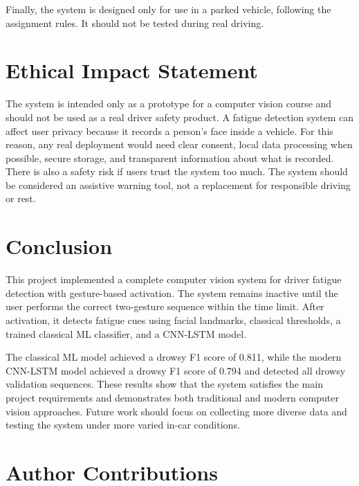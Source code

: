 \documentclass[conference]{IEEEtran}
\begin{document}
Finally, the system is designed only for use in a parked vehicle, following the assignment rules. It should not be tested during real driving.

\section*{Ethical Impact Statement}

The system is intended only as a prototype for a computer vision course and should not be used as a real driver safety product. A fatigue detection system can affect user privacy because it records a person's face inside a vehicle. For this reason, any real deployment would need clear consent, local data processing when possible, secure storage, and transparent information about what is recorded. There is also a safety risk if users trust the system too much. The system should be considered an assistive warning tool, not a replacement for responsible driving or rest.

\section{Conclusion}

This project implemented a complete computer vision system for driver fatigue detection with gesture-based activation. The system remains inactive until the user performs the correct two-gesture sequence within the time limit. After activation, it detects fatigue cues using facial landmarks, classical thresholds, a trained classical ML classifier, and a CNN-LSTM model.

The classical ML model achieved a drowsy F1 score of 0.811, while the modern CNN-LSTM model achieved a drowsy F1 score of 0.794 and detected all drowsy validation sequences. These results show that the system satisfies the main project requirements and demonstrates both traditional and modern computer vision approaches. Future work should focus on collecting more diverse data and testing the system under more varied in-car conditions.

\section*{Author Contributions}
\end{document}
